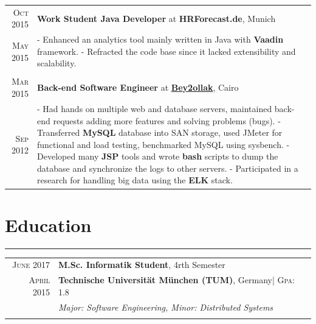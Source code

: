 \documentclass[a4paper,13pt]{article}
\begin{document}
\begin{adjustwidth}{-3cm}{}
\begin{tabular}{r|p{17.5cm}}

\textsc{Oct 2015} & \textbf{Work Student Java Developer} at \textbf{HRForecast.de}, Munich \\
\textsc{May 2015} & \footnotesize{ - Enhanced an analytics tool mainly written in Java with \textbf{Vaadin} framework. \newline
- Refracted the code base since it lacked extensibility and scalability.
} \\ 
\multicolumn{2}{c}{} \\


\textsc{Mar 2015} & \textbf{Back-end Software Engineer} at \href{http://desktop.bey2ollak.com/features-mentions/}{\textbf{Bey2ollak}}, Cairo \\
\textsc{Sep 2012} & 

\footnotesize{
	- Had hands on multiple web and database servers, maintained back-end requests adding more features and solving problems (bugs).\newline 
	- Transferred \textbf{MySQL} database into SAN storage, used JMeter for functional and load testing, benchmarked MySQL using sysbench.\newline
	- Developed many \textbf{JSP} tools and wrote \textbf{bash} scripts to dump the database and synchronize the logs to other servers.\newline
	- Participated in a research for handling big data using the \textbf{ELK} stack.
}
\end{tabular}





\section{Education}
\rule[0pt]{20cm}{0.5pt}

\begin{tabular}{r|p{17.5cm}}
		

\textsc{June 2017} & \textbf{M.Sc. Informatik Student}, 4rth Semester\\ \textsc{April} 2015 & \normalsize\textbf{Technische Universität München (TUM)}, Germany\footnotesize \hfill| \normalsize \textsc{Gpa}: 1.8\\
& \small\emph{Major: Software Engineering, Minor: Distributed Systems}
\\ \multicolumn{2}{c}{} \\


\end{tabular}
\end{adjustwidth}
\end{document}
